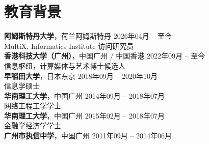 \section*{教育背景}

\textbf{阿姆斯特丹大学}，荷兰阿姆斯特丹 \hfill 2026年04月 -- 至今\\
MultiX, Informatics Institute 访问研究员 \hfill \\
\textbf{香港科技大学（广州）}，中国广州 / 中国香港 \hfill 2022年09月 -- 至今\\
信息枢纽，计算媒体与艺术博士候选人 \hfill \\
\textbf{早稻田大学}，日本东京 \hfill 2018年09月 -- 2020年10月\\
信息学硕士 \hfill \\
\textbf{华南理工大学}，中国广州 \hfill 2014年09月 -- 2018年07月\\
网络工程工学学士 \hfill \\
\textbf{华南理工大学}，中国广州 \hfill 2015年02月 -- 2018年07月\\
金融学经济学学士 \hfill \\
\textbf{广州市执信中学}，中国广州 \hfill 2011年09月 -- 2014年06月
